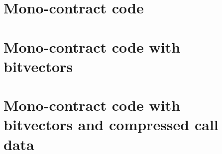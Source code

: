 \documentclass{article}
\begin{document}
		

	\section{Mono-contract code}

		

	\section{Mono-contract code with bitvectors}
		\label{app:mono-contract-code-with-bitvectors}

		

	\section{Mono-contract code with bitvectors and compressed call data}
		\label{app:mono-contract-code-with-bitvectors-and-compressed-call-data}

		

	\pagebreak
\end{document}
